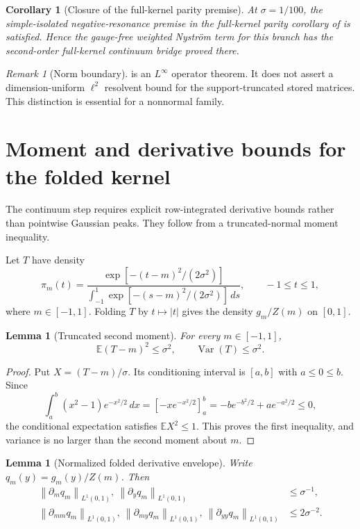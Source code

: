 \documentclass[11pt]{article}
\newtheorem{lemma}[theorem]{Lemma}
\newtheorem{corollary}[theorem]{Corollary}
\theoremstyle{definition}
\theoremstyle{remark}
\newtheorem{remark}[theorem]{Remark}
\newcommand{\norm}[1]{\left\lVert #1\right\rVert}
\begin{document}
\begin{corollary}[Closure of the full-kernel parity premise]
\label{cor:riesz}
At $\sigma=1/100$, the simple-isolated negative-resonance premise in the
full-kernel parity corollary of \citet{WangRiesz2026} is satisfied.  Hence
the gauge-free weighted Nystr\"om term for this branch has the
second-order full-kernel continuum bridge proved there.
\end{corollary}

\begin{remark}[Norm boundary]
\label{rem:norm-boundary}
 is an $L^\infty$ operator theorem.  It does not assert a
dimension-uniform $\ell^2$ resolvent bound for the support-truncated stored
matrices.  This distinction is essential for a nonnormal family.
\end{remark}

\section{Moment and derivative bounds for the folded kernel}
\label{sec:derivatives}

The continuum step requires explicit row-integrated derivative bounds rather
than pointwise Gaussian peaks.  They follow from a truncated-normal moment
inequality.

Let $T$ have density
\[
 \pi_m(t)=\frac{\exp[-(t-m)^2/(2\sigma^2)]}
 {\int_{-1}^1\exp[-(s-m)^2/(2\sigma^2)]\,ds},
 \qquad -1\le t\le1,
\]
where $m\in[-1,1]$.  Folding $T$ by $t\mapsto|t|$ gives the density
$g_m/Z(m)$ on $[0,1]$.

\begin{lemma}[Truncated second moment]
\label{lem:moment}
For every $m\in[-1,1]$,
\[
 \mathbb E(T-m)^2\le\sigma^2,
 \qquad
 \operatorname{Var}(T)\le\sigma^2.
\]
\end{lemma}

\begin{proof}
Put $X=(T-m)/\sigma$.  Its conditioning interval is $[a,b]$ with
$a\le0\le b$.  Since
\[
 \int_a^b(x^2-1)e^{-x^2/2}\,dx
 =[-xe^{-x^2/2}]_a^b
 =-be^{-b^2/2}+ae^{-a^2/2}\le0,
\]
the conditional expectation satisfies $\mathbb E X^2\le1$.  This proves the
first inequality, and variance is no larger than the second moment about
$m$.
\end{proof}

\begin{lemma}[Normalized folded derivative envelope]
\label{lem:folded-derivatives}
Write $q_m(y)=g_m(y)/Z(m)$.  Then
\begin{align}
 \norm{\partial_m q_m}_{L^1(0,1)},
 \ \norm{\partial_y q_m}_{L^1(0,1)}
 &\le \sigma^{-1},
 \label{eq:first-folded}\\
 \norm{\partial_{mm}q_m}_{L^1(0,1)},
 \ \norm{\partial_{my}q_m}_{L^1(0,1)},
 \ \norm{\partial_{yy}q_m}_{L^1(0,1)}
 &\le2\sigma^{-2}.
 \label{eq:second-folded}
\end{align}
\end{lemma}
\end{document}
